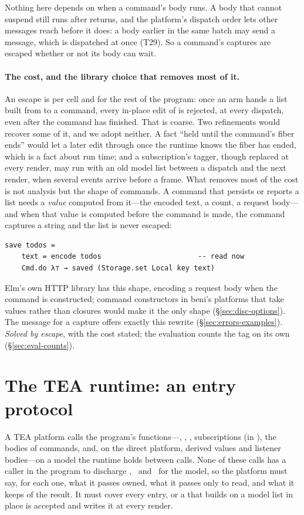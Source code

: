 Nothing here depends on when a command's body runs. A body that cannot suspend still runs after
 returns, and the platform's dispatch order lets other messages reach  before it
does: a body earlier in the same batch may send a message, which is dispatched at once (T29). So a
command's captures are escaped whether or not its body can wait.

\paragraph{The cost, and the library choice that removes most of it.} An escape is per cell and for the
rest of the program: once an arm hands a list built from  to a command, every in-place
edit of  is rejected, at every dispatch, even after the command has finished. That is
coarse. Two refinements would recover some of it, and we adopt neither. A fact ``held until the command's
fiber ends'' would let a later edit through once the runtime knows the fiber has ended, which is a fact
about run time; and a subscription's tagger, though replaced at every render, may run with an old model
list between a dispatch and the next render, when several events arrive before a frame. What removes most
of the cost is not analysis but the shape of commands. A command that persists or reports a list needs a
\emph{value} computed from it---the encoded text, a count, a request body---and when that value is computed
before the command is made, the command captures a string and the list is never escaped:
\begin{Verbatim}
save todos =
    text = encode todos                       -- read now
    Cmd.do λ⊤ → saved (Storage.set Local key text)
\end{Verbatim}
Elm's own HTTP library has this shape, encoding a request body when the command is constructed; command
constructors in beni's platforms that take values rather than closures would make it the only shape
(\S\ref{sec:disc-options}). The message for a capture offers exactly this rewrite
(\S\ref{sec:errors-examples}). \emph{Solved by escape}, with the cost stated; the evaluation counts the
tag on its own (\S\ref{sec:eval-counts}).

\section{The TEA runtime: an entry protocol}
\label{sec:hard-tea}

A TEA platform calls the program's functions---, , , subscriptions
(in ), the bodies of commands, and, on the direct platform, derived values and listener
bodies---on a model the runtime holds between calls. None of these calls has a caller in the program to
discharge \Unescaped, \Dead\ and \Disjoint\ for the model, so the platform must say, for each one, what it
passes owned, what it passes only to read, and what it keeps of the result. It must cover every entry, or
a  that builds on a model list in place is accepted and writes it at every render.

